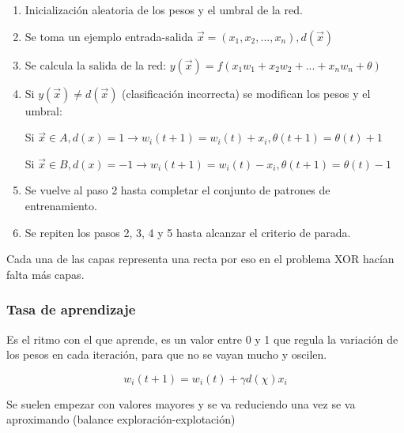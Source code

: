 \documentclass[12pt, twoside, openright]{report} %
\begin{document}
\begin{enumerate}
	\item Inicialización aleatoria de los pesos y el umbral de la red.
	\item Se toma un ejemplo entrada-salida $\vec{x} = (x_1, x_2, ..., x_n), d(\vec{x})$
	\item Se calcula la salida de la red: $y(\vec{x}) = f (x_1w_1 + x_2w_2 + ... + x_nw_n + \theta)$
	\item Si $y(\vec{x}) \neq d(\vec{x})$ (clasificación incorrecta) se modifican los pesos y el umbral:

	      Si $\vec{x} \in A, d(x) = 1 \rightarrow w_i(t+1) = w_i(t)+x_i, \theta(t+1) = \theta(t)+1$

	      Si $\vec{x} \in B, d(x) = -1 \rightarrow w_i(t+1) = w_i(t)-x_i, \theta(t+1) = \theta(t)-1$

	\item Se vuelve al paso 2 hasta completar el conjunto de patrones de entrenamiento.
	\item Se repiten los pasos 2, 3, 4 y 5 hasta alcanzar el criterio de parada.
\end{enumerate}

Cada una de las capas representa una recta por eso en el problema XOR hacían falta más capas.

\subsubsection{Tasa de aprendizaje}
Es el ritmo con el que aprende, es un valor entre 0 y 1 que regula la variación de los pesos en cada iteración, para que no se vayan mucho y oscilen.

$$w_i(t+1)=w_i(t)+\gamma d(\chi)x_i$$

Se suelen empezar con valores mayores y se va reduciendo una vez se va aproximando (balance exploración-explotación)
\end{document}

